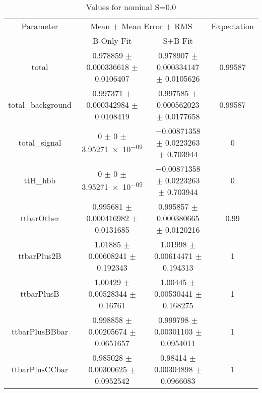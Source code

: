 \begin{table}
\centering
\caption{Values for nominal S=0.0}
\begin{tabular}{cccc}
\toprule
Parameter & \multicolumn{2}{c}{Mean $\pm$ Mean Error $\pm$ RMS} & Expectation\\
 & B-Only Fit & S+B Fit & \\
\midrule
total & \num{0.978859} $\pm$ \num{0.000336618} $\pm$ \num{0.0106407} & \num{0.978907} $\pm$ \num{0.000334147} $\pm$ \num{0.0105626} & \num{0.99587}\\
total\_background & \num{0.997371} $\pm$ \num{0.000342984} $\pm$ \num{0.0108419} & \num{0.997585} $\pm$ \num{0.000562023} $\pm$ \num{0.0177658} & \num{0.99587}\\
total\_signal & \num{0} $\pm$ \num{0} $\pm$ \num{3.95271e-09} & \num{-0.00871358} $\pm$ \num{0.0223263} $\pm$ \num{0.703944} & \num{0}\\
ttH\_hbb & \num{0} $\pm$ \num{0} $\pm$ \num{3.95271e-09} & \num{-0.00871358} $\pm$ \num{0.0223263} $\pm$ \num{0.703944} & \num{0}\\
ttbarOther & \num{0.995681} $\pm$ \num{0.000416982} $\pm$ \num{0.0131685} & \num{0.995857} $\pm$ \num{0.000380665} $\pm$ \num{0.0120216} & \num{0.99}\\
ttbarPlus2B & \num{1.01885} $\pm$ \num{0.00608241} $\pm$ \num{0.192343} & \num{1.01998} $\pm$ \num{0.00614471} $\pm$ \num{0.194313} & \num{1}\\
ttbarPlusB & \num{1.00429} $\pm$ \num{0.00528344} $\pm$ \num{0.16761} & \num{1.00445} $\pm$ \num{0.00530441} $\pm$ \num{0.168275} & \num{1}\\
ttbarPlusBBbar & \num{0.998858} $\pm$ \num{0.00205674} $\pm$ \num{0.0651657} & \num{0.999798} $\pm$ \num{0.00301103} $\pm$ \num{0.0954011} & \num{1}\\
ttbarPlusCCbar & \num{0.985028} $\pm$ \num{0.00300625} $\pm$ \num{0.0952542} & \num{0.98414} $\pm$ \num{0.00304898} $\pm$ \num{0.0966083} & \num{1}\\
\bottomrule
\end{tabular}
\end{table}